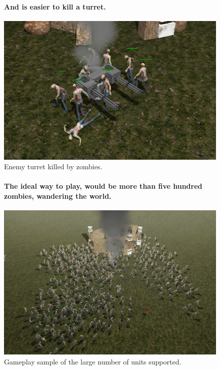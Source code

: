 \documentclass[a4paper,10pt]{article}
\newcommand{\p}[1]{\paragraph{\indent\textnormal{#1}}}
\begin{document}
	\begin{figure}[hbt]	
	\p{And is easier to kill a turret. \newline}    
	    \begin{center}
			\includegraphics[scale=.7]{captura4.png}
	    \end{center}
	    \caption{Enemy turret killed by zombies.}
	\end{figure}

	\begin{figure}[hbt]	
	\p{The ideal way to play, would be more than \textbf{five hundred} zombies, wandering the world. \newline}
    
	    \begin{center}
			\includegraphics[scale=.6]{captura5.png}
	    \end{center}
	    \caption{Gameplay sample of the large number of units supported.}
	\end{figure}
	
\end{document}
